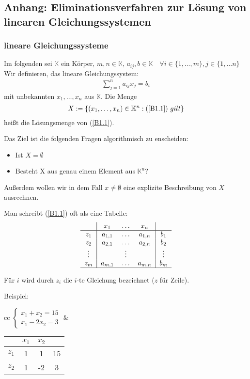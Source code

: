  \subsection{Anhang: Eliminationsverfahren zur Lösung von linearen Gleichungssystemen}
 \subsubsection{lineare Gleichungssysteme}
 Im folgenden sei $ \mathbb{K} $ ein Körper, $ m,n \in \mathbb{K} $, $ a_{ij},b \in \mathbb{K} \quad  \forall i \in \{1, \ldots, m \}, j \in \{1, \ldots n \} $
 Wir definieren, das lineare Gleichungssystem:
 \begin{eqnarray}
 	\sum_{j=1}^{n}a_{ij}x_j = b_i \label{B1.1}
 \end{eqnarray}
 mit unbekannten $ x_1, \ldots, x_n $ aus $ \mathbb{K} $. Die Menge
\begin{eqnarray}
	X := \{(x_1, \ldots, x_n) \in \mathbb{K}^n : (\ref{B1.1})~gilt \} \label{B1.2}
\end{eqnarray}
heißt die Lösungsmenge von (\ref{B1.1}).

Das Ziel ist die folgenden Fragen algorithmisch zu enscheiden:
\begin{itemize}
	\item
		Ist $ X = \emptyset $
	\item
		Besteht X aus genau einem Element aus $ \mathbb{K}^n $?
\end{itemize}
 Außerdem wollen wir in dem Fall $ x \neq \emptyset $ eine explizite Beschreibung von $ X $ ausrechnen.
 
 Man schreibt (\ref{B1.1}) oft als eine Tabelle:
 \begin{align*}
	 \begin{tabular}{c|ccc|c}
	 	& $ x_1 $ & $ \ldots $ &$  x_n  $& \\
	 	\hline
	 	$ z_1 $ & $ a_{1,1} $ & $ \ldots $ & $ a_{1,n} $ & $ b_1 $ \\
	 	$ z_2 $ & $ a_{2,1} $ & $ \ldots $ & $ a_{2,n} $ & $ b_2 $ \\
	 	\vdots & & \vdots & & \vdots \\
	 	$ z_m $ & $ a_{m,1} $ & $ \ldots $ & $ a_{m,n} $ & $ b_m $ \\
	 	\hline
	  \end{tabular}
 \end{align*}
 
 Für $ i $ wird durch $ z_i $ die $ i $-te Gleichung bezeichnet ($ z $ für Zeile).
 
 Beispiel: 
 \begin{tabular}{cc}
	 $ \begin{cases}
		 x_1 + x_2 = 15 \\
		 x_1 - 2x_2 = 3
	 \end{cases} $ 
	&
	 \begin{tabular}{c|cc|c}
 	 	& $ x_1 $ &$  x_2  $& \\
 	 	\hline
 	 	$ z_1 $ & 1 & 1 & 15 \\
 	 	$ z_2 $ & 1 & -2 & 3 \\
 	 	\hline
	 \end{tabular}
 \end{tabular}
 
